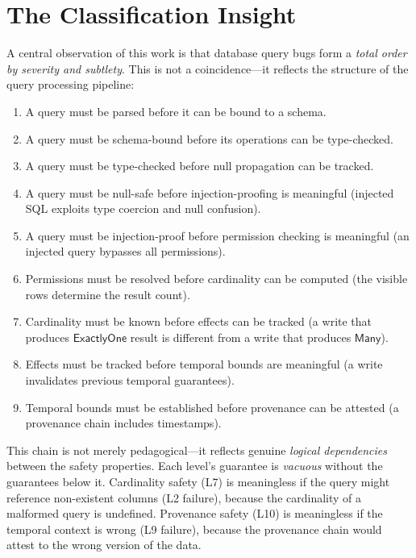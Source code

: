 \documentclass[11pt,a4paper]{article}
\begin{document}
\section{The Classification Insight}\label{sec:classification}

A central observation of this work is that database query bugs form
a \emph{total order by severity and subtlety}.  This is not a
coincidence---it reflects the structure of the query processing
pipeline:

\begin{enumerate}[nosep]
  \item A query must be parsed before it can be bound to a schema.
  \item A query must be schema-bound before its operations can be
    type-checked.
  \item A query must be type-checked before null propagation can be
    tracked.
  \item A query must be null-safe before injection-proofing is
    meaningful (injected SQL exploits type coercion and null confusion).
  \item A query must be injection-proof before permission checking
    is meaningful (an injected query bypasses all permissions).
  \item Permissions must be resolved before cardinality can be
    computed (the visible rows determine the result count).
  \item Cardinality must be known before effects can be tracked
    (a write that produces $\mathsf{ExactlyOne}$ result is different
    from a write that produces $\mathsf{Many}$).
  \item Effects must be tracked before temporal bounds are meaningful
    (a write invalidates previous temporal guarantees).
  \item Temporal bounds must be established before provenance can
    be attested (a provenance chain includes timestamps).
\end{enumerate}

This chain is not merely pedagogical---it reflects genuine
\emph{logical dependencies} between the safety properties.  Each
level's guarantee is \emph{vacuous} without the guarantees below it.
Cardinality safety (L7) is meaningless if the query might reference
non-existent columns (L2 failure), because the cardinality of a
malformed query is undefined.  Provenance safety (L10) is meaningless
if the temporal context is wrong (L9 failure), because the provenance
chain would attest to the wrong version of the data.
\end{document}
